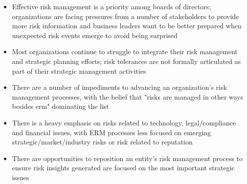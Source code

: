 \begin{itemize}
    \item Effective risk management is a priority among boards of directors;
            organizations are facing pressures from a number of stakeholders to provide more risk information and
            business leaders want to be better prepared when unexpected risk events emerge to avoid being surprised
    \item Most organizations continue to struggle to integrate their risk management and strategic planning efforts;
            risk tolerances are not formally articulated as part of their strategic management activities
    \item There are a number of impediments to advancing an organization’s risk management processes,
            with the belief that "risks are managed in other ways besides \gls{erm}" dominating the list
    \item There is a heavy emphasis on risks related to technology, legal/compliance and financial issues,
            with ERM processes less focused on emerging strategic/market/industry risks or risk related to reputation
    \item There are opportunities to reposition an entity's risk management process to ensure risk insights
            generated are focused on the most important strategic issues
\end{itemize}



